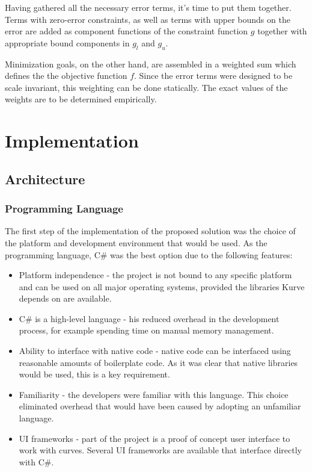 \documentclass[a4paper]{article}
\begin{document}
				Having gathered all the necessary error terms, it's time to put them together. Terms with zero-error constraints, as well as terms with upper bounds on the error are added as component functions of the constraint function \(g\) together with appropriate bound components in \(g_l\) and \(g_u\).

				Minimization goals, on the other hand, are assembled in a weighted sum which defines the the objective function \(f\). Since the error terms were designed to be scale invariant, this weighting can be done statically. The exact values of the weights are to be determined empirically.

	\section{Implementation}

		\subsection{Architecture}
			
			\subsubsection{Programming Language}
			
				The first step of the implementation of the proposed solution was the choice of the platform and development environment that would be used. 
				As the programming language, C\# was the best option due to the following features:
				
				\begin{itemize}
				  	\item Platform independence - the project is not bound to any specific platform and can be used on all major operating systems, provided the libraries Kurve depends on are available. 
				  	\item C\# is a high-level language - his reduced overhead in the development process, for example spending time on manual memory management.
					\item Ability to interface with native code - native code can be interfaced using reasonable amounts of boilerplate code. As it was clear that native libraries would be used, this is a key requirement.
					\item Familiarity - the developers were familiar with this language. This choice eliminated overhead that would have been caused by adopting an unfamiliar language.
					\item UI frameworks - part of the project is a proof of concept user interface to work with curves. Several UI frameworks are available that interface directly with C\#.
				\end{itemize}
			
\end{document}
